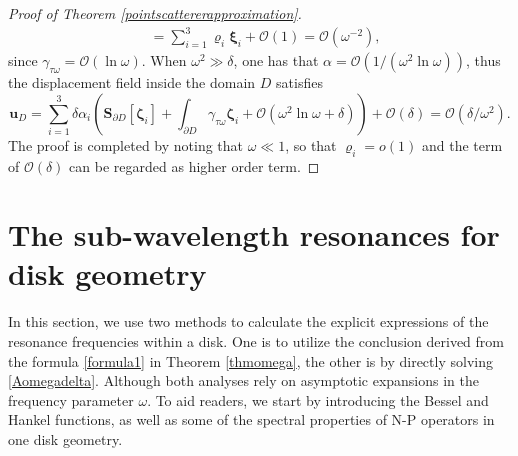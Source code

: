 \documentclass[10pt,reqno,oneside]{amsart}%
\theoremstyle{definition}
\theoremstyle{remark}
\numberwithin{equation}{section}
\numberwithin{equation}{section}
\begin{document}
\begin{proof}[Proof of Theorem \ref{pointscattererapproximation}]
\begin{equation}
\begin{aligned}
		&=\sum_{i=1}^3\varrho_i \boldsymbol{\xi}_i+\mathcal{O}(1)=\mathcal{O}(\omega^{-2}),
	\end{aligned}
\end{equation}
since $\gamma_{\tau\omega}=\mathcal{O}(\ln\omega)$. When $\omega^2\gg \delta$, one has that $\alpha=\mathcal{O}(1/(\omega^{2}\ln \omega))$, thus the displacement field inside the domain $D$ satisfies
\begin{equation}
	\mathbf{u}_{D}=\sum_{i=1}^3\delta\alpha_i \left(\mathbf{S}_{\partial D}[\boldsymbol{\zeta}_i]+\int_{\partial D}\gamma_{\tau\omega}\boldsymbol{\zeta}_i+\mathcal{O}(\omega^2\ln\omega+\delta)\right)+\mathcal{O}(\delta)=\mathcal{O}(\delta/\omega^2).
\end{equation}
The proof is completed by noting that $\omega\ll 1$, so that $\varrho_i=o(1)$ and the term of $\mathcal{O}(\delta)$ can be regarded as higher order term.
\end{proof}
\section{The sub-wavelength resonances for disk geometry}
In this section, we use two methods to calculate the explicit expressions of the resonance frequencies within a disk. One is to utilize the conclusion derived from the formula \eqref{formula1} in Theorem \ref{thmomega}, the other is by directly solving \eqref{Aomegadelta}. Although both analyses rely on asymptotic expansions in the frequency parameter $\omega$. To aid readers, we start by introducing the Bessel and Hankel functions, as well as some of the spectral properties of N-P operators in one disk geometry.
\end{document}

